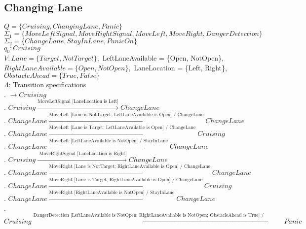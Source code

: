 \documentclass[12pt]{article}
\begin{document}
\begin{spacing}{1.5}
\subsection{Changing Lane}

\noindent $Q = \{Cruising, ChangingLane, Panic\}$\\
\noindent $\Sigma_1 = \{MoveLeftSignal, MoveRightSignal, MoveLeft, MoveRight, DangerDetection\}$\\
\noindent $\Sigma_2 = \{ChangeLane, StayInLane, PanicOn\}$\\
\noindent $q_0: Cruising$\\
\noindent $V: Lane = \{Target, NotTarget\}, $ LeftLaneAvailable  = \{Open, NotOpen\}, $ RightLaneAvailable  = \{Open, NotOpen\}, $ LaneLocation  = \{Left, Right\}, $ ObstacleAhead  = \{True, False\}$\\
\noindent $\Lambda$: Transition specifications\\

. $\rightarrow Cruising$\\
. $Cruising \xrightarrow {\text {MoveLeftSignal [LaneLocation is Left]}} ChangeLane$\\
. $ChangeLane \xrightarrow {\text {MoveLeft [Lane is NotTarget; LeftLaneAvailable is Open] / ChangeLane}} ChangeLane$\\
. $ChangeLane \xrightarrow {\text {MoveLeft [Lane is Target; LeftLaneAvailable is Open] / ChangeLane}} Cruising$\\
. $ChangeLane \xrightarrow {\text {MoveLeft [LeftLaneAvailable  is NotOpen] / StayInLane}} ChangeLane$\\
. $Cruising \xrightarrow {\text { MoveRightSignal [LaneLocation is Right]}} ChangeLane$\\
. $ChangeLane \xrightarrow {\text {MoveRight [Lane is NotTarget; RightLaneAvailable is Open] / ChangeLane}} ChangeLane$\\
. $ChangeLane \xrightarrow {\text {MoveRight [Lane is Target; RightLaneAvailable is Open] / ChangeLane}} Cruising$\\
. $ChangeLane \xrightarrow {\text {MoveRight [RightLaneAvailable is NotOpen] / StayInLane}} ChangeLane$\\
. $Cruising \xrightarrow {\text {DangerDetection [LeftLaneAvailable is NotOpen; RightLaneAvailable is NotOpen; ObstacleAhead is True] / (PanicModeOn)}} Panic$\\


\newpage


\end{spacing}
\end{document}
